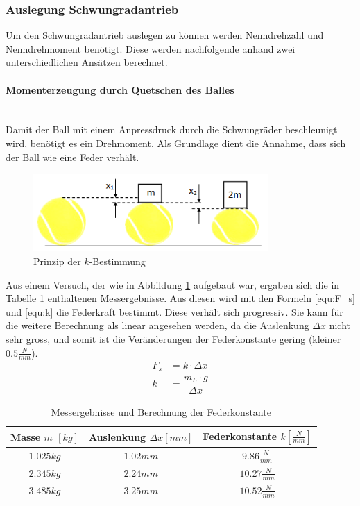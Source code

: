 \subsubsection{Auslegung Schwungradantrieb}
\label{BestimmungDrehmomentSchwundrad}
Um den Schwungradantrieb auslegen zu können werden Nenndrehzahl und Nenndrehmoment 
benötigt. Diese werden nachfolgende anhand zwei unterschiedlichen Ansätzen berechnet.
%
\paragraph{Momenterzeugung durch Quetschen des Balles}$~~$\vspace{2mm}\\
Damit der Ball mit einem Anpressdruck durch die Schwungräder beschleunigt 
wird, benötigt es ein Drehmoment. Als Grundlage dient die Annahme, dass sich der 
Ball wie eine Feder verhält.

\begin{figure}[h!]
	\centering
	\includegraphics[width=0.8\textwidth]
	{Enddokumentation/Anhang/Bilder/KompressionBaelle.png}
	\caption{Prinzip der $k$-Bestimmung}
	\label{fig:BallKomp}
\end{figure}

Aus einem Versuch, der wie in Abbildung \ref{fig:BallKomp} aufgebaut war, ergaben sich die in Tabelle \ref{tab:BallKompErgebnis} enthaltenen Messergebnisse. Aus diesen wird mit den Formeln \ref{equ:F_s} und \ref{equ:k} die Federkraft bestimmt. Diese verhält sich progressiv. Sie kann für die weitere Berechnung als linear angesehen werden, da die Auslenkung $\Delta x$ nicht sehr gross, und somit ist die Veränderungen der Federkonstante gering (kleiner $0.5 \frac{N}{mm}$).
\begin{align}  
    F_s &= k \cdot \Delta x 
    \label{equ:F_s}\\
    k &= \dfrac{m_L \cdot g}{\Delta x}
    \label{equ:k}
\end{align}
\begin{table}[h!]
	\begin{tabular}{ccc}
		\rule{0pt}{11pt} Masse $m$ $\left[kg\right]$ & Auslenkung $\Delta x 
		\left[mm\right]$ & Federkonstante $k \left[\frac{N}{mm}\right]$\\
		\hline
		\rule{0pt}{11pt} $1.025 kg$ & $1.02 mm$ & $9.86  \frac{N}{mm}$\\
		\rule{0pt}{11pt} $2.345 kg$ & $2.24 mm$ & $10.27 \frac{N}{mm}$\\
		\rule{0pt}{11pt} $3.485 kg$ & $3.25 mm$ & $10.52 \frac{N}{mm}$\\
	\end{tabular}
	\centering
	\caption{Messergebnisse und Berechnung der Federkonstante}
	\label{tab:BallKompErgebnis}
\end{table}


